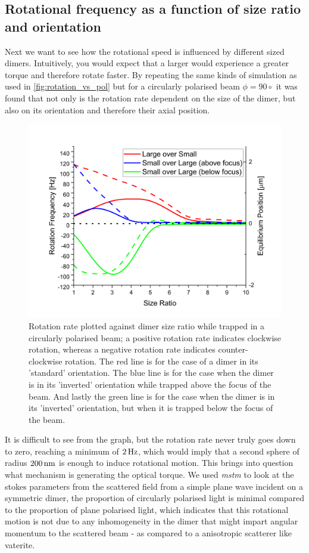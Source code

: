 \subsection{Rotational frequency as a function of size ratio and orientation}
Next we want to see how the rotational speed is influenced by 
different sized dimers. Intuitively, you would expect that a 
larger would experience a greater torque and therefore rotate 
faster. By repeating the same kinds of simulation as used in 
\ref{fig:rotation_vs_pol} but for a circularly polarised beam 
$\phi=90\circ$ it was found that not only is the rotation rate 
dependent on the size of the dimer, but also on its orientation 
and therefore their axial position.
\begin{figure}[h!]
  \centering
  \includegraphics[width=\linewidth]{rotation_rate_vs_size.png}
  \caption{Rotation rate plotted against dimer size ratio while trapped in a
  	circularly polarised beam; a positive rotation rate indicates clockwise 
  	rotation, whereas a negative rotation rate indicates counter-clockwise 
  	rotation. The red line is for the case of a dimer in its 'standard' 
  	orientation. The blue line is for the case when the dimer is in its 
  	'inverted' orientation while trapped above the focus of the beam. And 
  	lastly the green line is for the case when the dimer is in its 
  	'inverted' orientation, but when it is trapped below the focus of the 
  	beam.}
\end{figure}

It is difficult to see from the graph, but the rotation rate never
truly goes down to zero, reaching a minimum of $2\,{\rm Hz}$, which would
imply that a second sphere of radius $200\,{\rm nm}$ is enough to
induce rotational motion. This brings into question what mechanism is
generating the optical torque. We used \textit{mstm} to look at the stokes
parameters from the scattered field from a simple plane wave incident
on a symmetric dimer, the proportion of circularly polarised light is 
minimal compared to the proportion of plane polarised light, which 
indicates that this rotational motion is not due to any inhomogeneity 
in the dimer that might impart angular momentum to the scattered beam - 
as compared to a anisotropic scatterer like vaterite. 

